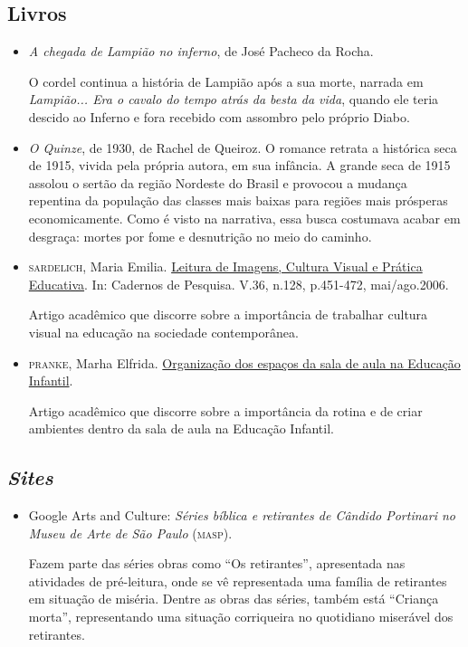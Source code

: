 \documentclass[11pt]{extarticle}
\begin{document}
\subsection{Livros}

\begin{itemize}
	\item \textit{A chegada de Lampião no inferno}, de José Pacheco da Rocha. 

O cordel continua a história de Lampião após a sua morte, narrada em \textit{Lampião... Era o cavalo do tempo atrás da besta da vida}, quando ele teria descido ao Inferno e fora recebido com assombro pelo próprio Diabo. 

	\item \textit{O Quinze}, de 1930, de Rachel de Queiroz. O romance retrata a histórica seca de 1915, vivida
pela própria autora, em sua infância. A grande seca de 1915 assolou o sertão da região Nordeste do Brasil
e provocou a mudança repentina da população das classes mais baixas para regiões mais prósperas economicamente.
Como é visto na narrativa, essa busca costumava acabar em desgraça: mortes por fome e desnutrição no meio do caminho.
\end{itemize}

\begin{itemize}
\item \textsc{sardelich}, Maria Emilia. \href{https://www.scielo.br/pdf/cp/v36n128/v36n128a09}{Leitura de Imagens, Cultura Visual e Prática Educativa}. 
In: Cadernos de Pesquisa. V.36, n.128, p.451-472, mai/ago.2006. 

Artigo acadêmico que discorre sobre a importância de trabalhar cultura 
visual na educação na sociedade contemporânea. 

\item {\textsc{pranke}}, Marha Elfrida. \href{http://centraldeinteligenciaacademica.blogspot.com/2016/04/organizacao-dos-espacos-da-sala-de-aula.html}{Organização dos espaços da sala de aula na Educação Infantil}. 

Artigo acadêmico que discorre sobre a importância da rotina e de criar ambientes dentro da sala de aula na Educação Infantil.  
\end{itemize}

\subsection{\textit{Sites}}

\begin{itemize}
\item Google Arts and Culture: \textit{Séries bíblica e retirantes de Cândido Portinari no Museu de Arte de São Paulo} (\textsc{masp}).

Fazem parte das séries obras como ``Os retirantes'', apresentada nas atividades de pré-leitura, onde se vê representada
uma família de retirantes em situação de miséria. Dentre as obras das séries, também está ``Criança morta'', representando uma
situação corriqueira no quotidiano miserável dos retirantes. 

\end{itemize}
\end{document}
